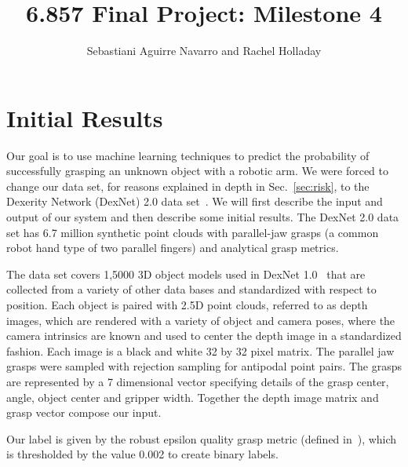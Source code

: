 \documentclass[letterpaper, 10 pt]{article}
\newcommand{\sref}[1]{Sec.~\ref{#1}} %
\begin{document}
\title{6.857 Final Project: Milestone 4}
\author{Sebastiani Aguirre Navarro and Rachel Holladay}
\maketitle

\section{Initial Results}
\label{sec:results}

Our goal is to use machine learning techniques to predict the probability of successfully grasping an unknown object with a robotic arm.
We were forced to change our data set, for reasons explained in depth in \sref{sec:risk}, to the Dexerity Network (DexNet) 2.0 data set~\cite{mahler2017dex}.
We will first describe the input and output of our system and then describe some initial results. 
The DexNet 2.0 data set has 6.7 million synthetic point clouds with parallel-jaw grasps (a common robot hand type of two parallel fingers) and analytical grasp metrics. 

The data set covers 1,5000 3D object models used in DexNet 1.0~\cite{mahler2016dex} that are collected from a variety of other data bases and standardized with respect to position. 
Each object is paired with 2.5D point clouds, referred to as depth images, which are rendered with a variety of object and camera poses, where the camera intrinsics are known and used to center the depth image in a standardized fashion.
Each image is a black and white 32 by 32 pixel matrix. 
The parallel jaw grasps were sampled with rejection sampling for antipodal point pairs. 
The grasps are represented by a 7 dimensional vector specifying details of the grasp center, angle, object center and gripper width. 
Together the depth image matrix and grasp vector compose our input. 

Our label is given by the robust epsilon quality grasp metric (defined in~\cite{seita2016large}), which is thresholded by the value 0.002 to create binary labels.
\end{document}
